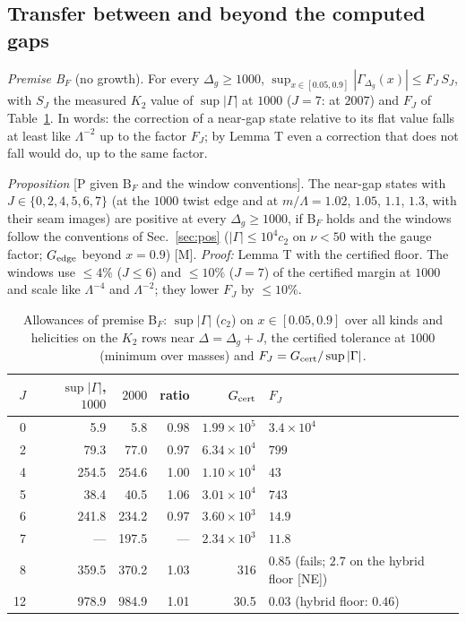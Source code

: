 \documentclass[aps,prl,onecolumn,superscriptaddress,nofootinbib]{revtex4-2}
\begin{document}
\subsection{Transfer between and beyond the computed gaps}
\emph{Premise B$_F$} (no growth). For every $\Delta_g\ge1000$, $\sup_{x\in[0.05,0.9]}|\Gamma_{\Delta_g}(x)|\le F_J\,S_J$, with $S_J$ the
measured $K_2$ value of $\sup|\Gamma|$ at $1000$ ($J=7$: at $2007$) and $F_J$ of Table~\ref{tab:BF}. In words: the correction of a
near-gap state relative to its flat value falls at least like $\Lambda^{-2}$ up to the factor $F_J$; by Lemma T even a correction that
does not fall would do, up to the same factor.

\emph{Proposition} [P given B$_F$ and the window conventions]. The near-gap states with $J\in\{0,2,4,5,6,7\}$ (at the $1000$ twist
edge and at $m/\Lambda=1.02$, $1.05$, $1.1$, $1.3$, with their seam images) are positive at every $\Delta_g\ge1000$, if B$_F$ holds and the
windows follow the conventions of Sec.~\ref{sec:pos} ($|\Gamma|\le10^4c_2$ on $\nu<50$ with the gauge factor; $G_{\rm edge}$ beyond
$x=0.9$) [M]. \emph{Proof:} Lemma T with the certified floor. The windows use $\le4\%$ ($J\le6$) and $\le10\%$ ($J=7$) of the certified
margin at $1000$ and scale like $\Lambda^{-4}$ and $\Lambda^{-2}$; they lower $F_J$ by $\le10\%$.

\begin{table}[!htbp]
\caption{\label{tab:BF}Allowances of premise B$_F$: $\sup|\Gamma|$ ($c_2$) on $x\in[0.05,0.9]$ over all kinds and helicities on the
$K_2$ rows near $\Delta=\Delta_g+J$, the certified tolerance at $1000$ (minimum over masses) and $F_J=G_{\rm cert}/\sup|\Gamma|$.}
\footnotesize
\begin{ruledtabular}
\begin{tabular}{rrrrrl}
$J$ & $\sup|\Gamma|$, $1000$ & $2000$ & ratio & $G_{\rm cert}$ & $F_J$\\\hline
0 & 5.9 & 5.8 & 0.98 & $1.99\times10^5$ & $3.4\times10^4$\\
2 & 79.3 & 77.0 & 0.97 & $6.34\times10^4$ & $799$\\
4 & 254.5 & 254.6 & 1.00 & $1.10\times10^4$ & $43$\\
5 & 38.4 & 40.5 & 1.06 & $3.01\times10^4$ & $743$\\
6 & 241.8 & 234.2 & 0.97 & $3.60\times10^3$ & $14.9$\\
7 & --- & 197.5 & --- & $2.34\times10^3$ & $11.8$\\
8 & 359.5 & 370.2 & 1.03 & 316 & $0.85$ (fails; $2.7$ on the hybrid floor [NE])\\
12 & 978.9 & 984.9 & 1.01 & 30.5 & $0.03$ (hybrid floor: $0.46$)\\
\end{tabular}
\end{ruledtabular}
\end{table}
\end{document}

